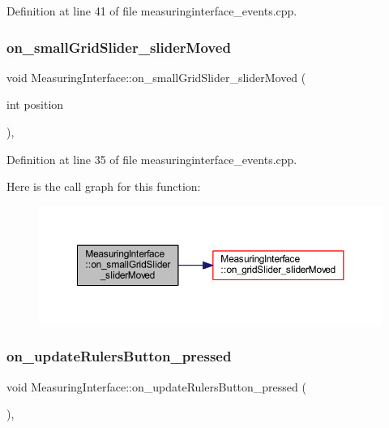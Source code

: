 Definition at line 41 of file measuringinterface\+\_\+events.\+cpp.

\mbox{\label{classMeasuringInterface_af76bfc58f5f4a96c860d64dd0b650e5e}} 
\subsubsection{\texorpdfstring{on\_smallGridSlider\_sliderMoved}{on\_smallGridSlider\_sliderMoved}}
{\footnotesize\ttfamily void Measuring\+Interface\+::on\+\_\+small\+Grid\+Slider\+\_\+slider\+Moved (\begin{DoxyParamCaption}\item[{int}]{position }\end{DoxyParamCaption})\hspace{0.3cm}{\ttfamily [private]}, {\ttfamily [slot]}}



Definition at line 35 of file measuringinterface\+\_\+events.\+cpp.

Here is the call graph for this function\+:
\nopagebreak
\begin{figure}[H]
\begin{center}
\leavevmode
\includegraphics[width=350pt]{classMeasuringInterface_af76bfc58f5f4a96c860d64dd0b650e5e_cgraph}
\end{center}
\end{figure}
\mbox{\label{classMeasuringInterface_a18a63bf732f8df1ed9b94450b19ef455}} 
\subsubsection{\texorpdfstring{on\_updateRulersButton\_pressed}{on\_updateRulersButton\_pressed}}
{\footnotesize\ttfamily void Measuring\+Interface\+::on\+\_\+update\+Rulers\+Button\+\_\+pressed (\begin{DoxyParamCaption}{ }\end{DoxyParamCaption})\hspace{0.3cm}{\ttfamily [private]}, {\ttfamily [slot]}}



